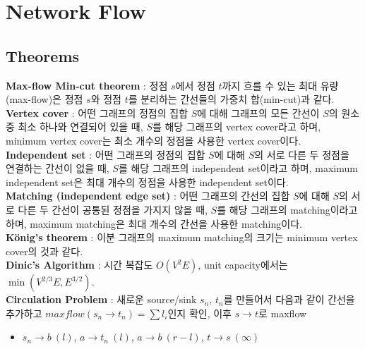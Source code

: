 \documentclass[landscape, 8pt, a4paper, oneside, twocolumn]{extarticle}
\begin{document}
\section{Network Flow}

\subsection{Theorems}
\noindent\textbf{Max-flow Min-cut theorem} : 정점 $ s $에서 정점 $ t $까지 흐를 수 있는 최대 유량(max-flow)은 정점 $ s $와 정점 $ t $를 분리하는 간선들의 가중치 합(min-cut)과 같다.\\
\textbf{Vertex cover} : 어떤 그래프의 정점의 집합 $ S $에 대해 그래프의 모든 간선이 $ S $의 원소 중 최소 하나와 연결되어 있을 때, $ S $를 해당 그래프의 vertex cover라고 하며, minimum vertex cover는 최소 개수의 정점을 사용한 vertex cover이다.\\
\textbf{Independent set} : 어떤 그래프의 정점의 집합 $ S $에 대해 $ S $의 서로 다른 두 정점을 연결하는 간선이 없을 때, $ S $를 해당 그래프의 independent set이라고 하며, maximum independent set은 최대 개수의 정점을 사용한 independent set이다.\\
\textbf{Matching (independent edge set)} : 어떤 그래프의 간선의 집합 $ S $에 대해 $ S $의 서로 다른 두 간선이 공통된 정점을 가지지 않을 때, $ S $를 해당 그래프의 matching이라고 하며, maximum matching은 최대 개수의 간선을 사용한 matching이다.\\
\textbf{K\"onig's theorem} : 이분 그래프의 maximum matching의 크기는 minimum vertex cover의 것과 같다.\\
\textbf{Dinic's Algorithm} : 시간 복잡도 $O(V^2E)$, unit capacity에서는 $\min(V^{2/3}E, E^{3/2})$.\\
\textbf{Circulation Problem} : 새로운 source/sink $s_{n}$, $t_{n}$를 만들어서 다음과 같이 간선을 추가하고 $maxflow(s_{n} \to t_{n}) = \sum l_i$인지 확인, 이후 $s \to t$로 maxflow
\begin{itemize}
\item $s_{n} \to b\ (l)$, $a \to t_{n}\ (l)$, $a \to b\ (r-l)$, $t \to s\ (\infty)$
\end{itemize}
\end{document}
